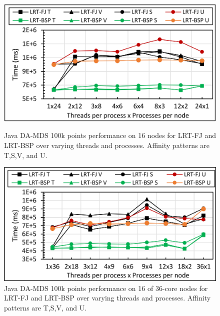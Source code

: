 \documentclass[10pt, conference, compsocconf]{IEEEtran}
\begin{document}
\begin{figure}[!htb]
	\begin{minipage}{0.49\textwidth}
        \centering
        \includegraphics[width=1\columnwidth]{images/fig_damds_100k_binding_patterns}
        \caption{Java DA-MDS 100k points performance on 16 nodes for \ac{LRT-FJ} and \ac{LRT-BSP} over varying threads and processes. Affinity patterns are T,S,V, and U.}
        \label{fig:fig_damds_100k_binding_patterns}
    \end{minipage}
    \hspace{1.4mm}
    \begin{minipage}{0.49\textwidth}
        \centering
        \includegraphics[width=1\columnwidth]{images/fig_damds_100k_binding_patterns_on_36core_nodes}
        \caption{Java DA-MDS 100k points performance on 16 of 36-core nodes for \ac{LRT-FJ} and \ac{LRT-BSP} over varying threads and processes. Affinity patterns are T,S,V, and U.}
        \label{fig:fig_damds_100k_binding_patterns_on_36core_nodes}
    \end{minipage}
\end{figure}
\end{document}
